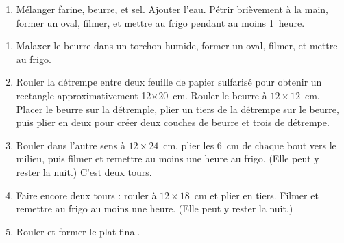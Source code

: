\label{pâte-feuilletée}


\begin{ingredients}
\end{ingredients}

\begin{recipe}
  \begin{enumerate}

  \item Mélanger farine, beurre, et sel.  Ajouter l'eau.
    Pétrir brièvement à la main, former un oval, filmer, et mettre au
    frigo pendant au moins 1~heure.
  \end{enumerate}
\end{recipe}
  

\begin{ingredients}
\end{ingredients}

\begin{recipe}
  \begin{enumerate}
  \item Malaxer le beurre dans un torchon humide, former un oval,
    filmer, et mettre au frigo.
    
  \item Rouler la détrempe entre deux feuille de papier sulfarisé pour
    obtenir un rectangle approximativement 12$ \times $20~cm.  Rouler
    le beurre à $12\times 12$~cm.  Placer le beurre sur la détremple,
    plier un tiers de la détrempe sur le beurre, puis plier en deux
    pour créer deux couches de beurre et trois de détrempe.
    
  \item Rouler dans l'autre sens à $12\times 24$~cm, plier les 6~cm de
    chaque bout vers le milieu, puis filmer et remettre au moins une
    heure au frigo.  (Elle peut y rester la nuit.)  C'est deux tours.
    
  \item Faire encore deux tours : rouler à $12\times 18$~cm et plier
    en tiers.  Filmer et remettre au frigo au moins une heure.  (Elle
    peut y rester la nuit.)
    
  \item Rouler et former le plat final.

  \end{enumerate}
\end{recipe}

